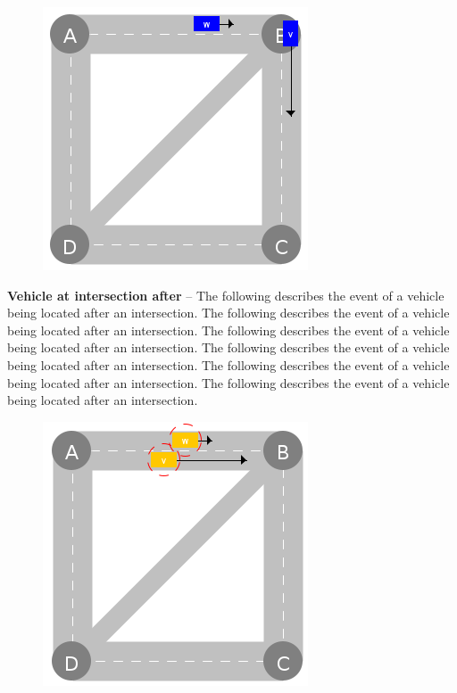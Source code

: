 \documentclass[graybox]{svmult}
\begin{document}
\vspace{4mm}
\begin{figure}
	\centering
		\includegraphics[scale=0.35]{../../events/vehicle-at-intersection-after.png}
\end{figure}

\noindent
\textbf{Vehicle at intersection after}
--
The following describes the event of a vehicle being located after an intersection. 
The following describes the event of a vehicle being located after an intersection. 
The following describes the event of a vehicle being located after an intersection. 
The following describes the event of a vehicle being located after an intersection. 
The following describes the event of a vehicle being located after an intersection. 
The following describes the event of a vehicle being located after an intersection. 

\vspace{4mm}

\begin{figure}
	\centering
	\includegraphics[scale=0.35]{../../events/faster-vehicle-front-at-slower-vehicle-back.png}
\end{figure}
\end{document}
